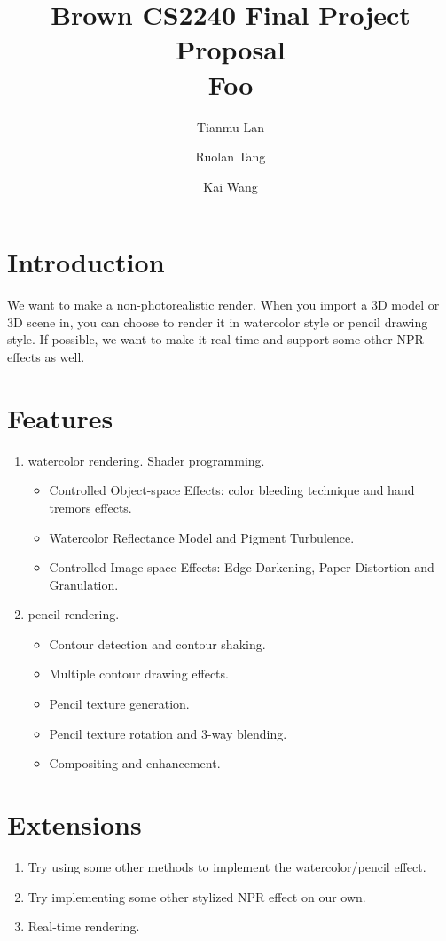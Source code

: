 \documentclass[acmtog, table, dvipsnames]{acmart}
\begin{document}
\title{\textbf{Brown CS2240 Final Project Proposal} \\
       Foo}
\author{Tianmu Lan}
\author{Ruolan Tang}
\author{Kai Wang}
\maketitle

\section{Introduction}
We want to make a non-photorealistic render. When you import a 3D model or 3D scene in, you can choose to render it in watercolor style or pencil drawing style. If possible, we want to make it real-time and support some other NPR effects as well.

\section{Features}
\begin{enumerate}
\item watercolor rendering. Shader programming. \cite{montesdeoca2016art}
    \begin{itemize}
	\item Controlled Object-space Effects: color bleeding technique and hand tremors effects.
	\item Watercolor Reflectance Model and Pigment Turbulence.
	\item Controlled Image-space Effects: Edge Darkening, Paper Distortion and Granulation.
    \end{itemize}
\item pencil rendering. \cite{lee2006real} \cite{praun2001real}
    \begin{itemize}
	\item Contour detection and contour shaking.
	\item Multiple contour drawing effects.
	\item Pencil texture generation. 
	\item Pencil texture rotation and 3-way blending.
	\item Compositing and enhancement.
    \end{itemize}
\end{enumerate}

\section{Extensions}
\begin{enumerate}
\item Try using some other methods to implement the watercolor/pencil effect.
\item Try implementing some other stylized NPR effect on our own.
\item Real-time rendering.
\end{enumerate}
\end{document}
